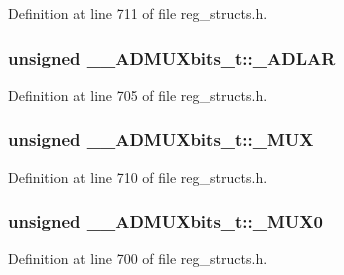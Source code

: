 Definition at line 711 of file reg\+\_\+structs.\+h.

\hypertarget{union_____a_d_m_u_xbits__t_aa754fb5ce7316d73aa845c8a871c9d9f}{
\subsubsection[{\+\_\+\+A\+D\+L\+A\+R}]{\setlength{\rightskip}{0pt plus 5cm}unsigned \+\_\+\+\_\+\+A\+D\+M\+U\+Xbits\+\_\+t\+::\+\_\+\+A\+D\+L\+A\+R}}\label{union_____a_d_m_u_xbits__t_aa754fb5ce7316d73aa845c8a871c9d9f}


Definition at line 705 of file reg\+\_\+structs.\+h.

\hypertarget{union_____a_d_m_u_xbits__t_ad17d75c029c93f0b1505ac191bc915f0}{
\subsubsection[{\+\_\+\+M\+U\+X}]{\setlength{\rightskip}{0pt plus 5cm}unsigned \+\_\+\+\_\+\+A\+D\+M\+U\+Xbits\+\_\+t\+::\+\_\+\+M\+U\+X}}\label{union_____a_d_m_u_xbits__t_ad17d75c029c93f0b1505ac191bc915f0}


Definition at line 710 of file reg\+\_\+structs.\+h.

\hypertarget{union_____a_d_m_u_xbits__t_a4d3f3465c2e3e962a61fa8dd277f3e05}{
\subsubsection[{\+\_\+\+M\+U\+X0}]{\setlength{\rightskip}{0pt plus 5cm}unsigned \+\_\+\+\_\+\+A\+D\+M\+U\+Xbits\+\_\+t\+::\+\_\+\+M\+U\+X0}}\label{union_____a_d_m_u_xbits__t_a4d3f3465c2e3e962a61fa8dd277f3e05}


Definition at line 700 of file reg\+\_\+structs.\+h.

